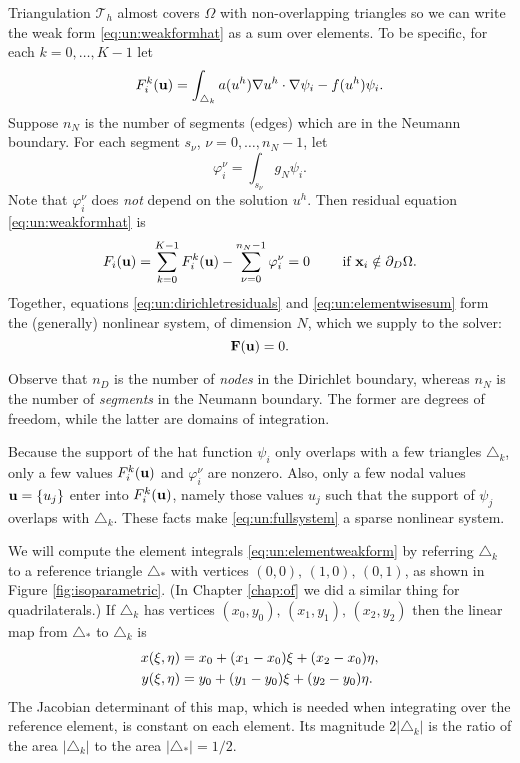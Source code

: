 Triangulation $\mathcal{T}_h$ almost covers $\Omega$ with non-overlapping triangles so we can write the weak form \eqref{eq:un:weakformhat} as a sum over elements.  To be specific, for each $k=0,\dots,K-1$ let
\begin{equation}
F_i^k(\mathbf{u}) = \int_{\triangle_k} a(u^h) \nabla u^h \cdot \nabla \psi_i - f(u^h) \psi_i.  \label{eq:un:elementweakform}
\end{equation}
Suppose $n_N$ is the number of segments (edges) which are in the Neumann boundary.  For each segment $s_\nu$, $\nu=0,\dots,n_N-1$, let
\begin{equation}
\varphi_i^\nu = \int_{s_\nu} g_N \psi_i.  \label{eq:un:segmentweakform}
\end{equation}
Note that $\varphi_i^\nu$ does \emph{not} depend on the solution $u^h$.  Then residual equation \eqref{eq:un:weakformhat} is
\begin{equation}
F_i(\mathbf{u}) = \sum_{k=0}^{K-1} F_i^k(\mathbf{u}) - \sum_{\nu=0}^{n_N-1} \varphi_i^\nu = 0  \qquad \text{ if } \mathbf{x}_i \notin \partial_D\Omega. \label{eq:un:elementwisesum}
\end{equation}
Together, equations \eqref{eq:un:dirichletresiduals} and \eqref{eq:un:elementwisesum} form the (generally) nonlinear system, of dimension $N$, which we supply to the \pSNES solver:
\begin{equation}
\mathbf{F}(\mathbf{u})=0. \label{eq:un:fullsystem}
\end{equation}

Observe that $n_D$ is the number of \emph{nodes} in the Dirichlet boundary, whereas $n_N$ is the number of \emph{segments} in the Neumann boundary.  The former are degrees of freedom, while the latter are domains of integration.

Because the support of the hat function $\psi_i$ only overlaps with a few triangles $\triangle_k$, only a few values $F_i^k(\mathbf{u})$ and $\varphi_i^\nu$ are nonzero.  Also, only a few nodal values $\mathbf{u}=\{u_j\}$ enter into $F_i^k(\mathbf{u})$, namely those values $u_j$ such that the support of $\psi_j$ overlaps with $\triangle_k$.  These facts make \eqref{eq:un:fullsystem} a sparse nonlinear system.

We will compute the element integrals \eqref{eq:un:elementweakform} by referring $\triangle_k$ to a reference triangle $\triangle_\ast$ with vertices $(0,0),\,(1,0),\,(0,1)$, as shown in Figure \ref{fig:isoparametric}.  (In Chapter \ref{chap:of} we did a similar thing for quadrilaterals.)  If $\triangle_k$ has vertices $(x_0,y_0),\,(x_1,y_1),\,(x_2,y_2)$ then the linear map from $\triangle_\ast$ to $\triangle_k$ is
\begin{align}
x(\xi,\eta) &= x_0 + (x_1-x_0) \xi + (x_2-x_0) \eta, \label{eq:un:trianglemap} \\
y(\xi,\eta) &= y_0 + (y_1-y_0) \xi + (y_2-y_0) \eta. \notag
\end{align}
The Jacobian determinant of this map, which is needed when integrating over the reference element, is constant on each element.  Its magnitude $2|\triangle_k|$ is the ratio of the area $|\triangle_k|$ to the area $|\triangle_\ast|=1/2$.

